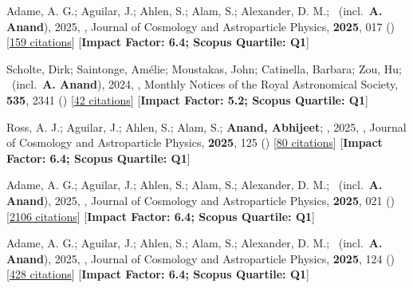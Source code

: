 \item[{\color{numcolor}\scriptsize9}] Adame, A. G.; Aguilar, J.; Ahlen, S.; Alam, S.; Alexander, D. M.; \etal\ (incl.\ \textbf{A. Anand}), 2025, , Journal of Cosmology and Astroparticle Physics, \textbf{2025}, 017 () [\href{https://ui.adsabs.harvard.edu/abs/2025JCAP...07..017A}{159 citations}] [\textbf{Impact Factor: 6.4; Scopus Quartile: Q1}]

\item[{\color{numcolor}\scriptsize8}] Scholte, Dirk; Saintonge, Am{\'e}lie; Moustakas, John; Catinella, Barbara; Zou, Hu; \etal\ (incl.\ \textbf{A. Anand}), 2024, , Monthly Notices of the Royal Astronomical Society, \textbf{535}, 2341 () [\href{https://ui.adsabs.harvard.edu/abs/2024MNRAS.535.2341S}{42 citations}] [\textbf{Impact Factor: 5.2; Scopus Quartile: Q1}]

\item[{\color{numcolor}\scriptsize7}] Ross, A. J.; Aguilar, J.; Ahlen, S.; Alam, S.; \textbf{Anand, Abhijeet}; \etal, 2025, , Journal of Cosmology and Astroparticle Physics, \textbf{2025}, 125 () [\href{https://ui.adsabs.harvard.edu/abs/2025JCAP...01..125R}{80 citations}] [\textbf{Impact Factor: 6.4; Scopus Quartile: Q1}]

\item[{\color{numcolor}\scriptsize6}] Adame, A. G.; Aguilar, J.; Ahlen, S.; Alam, S.; Alexander, D. M.; \etal\ (incl.\ \textbf{A. Anand}), 2025, , Journal of Cosmology and Astroparticle Physics, \textbf{2025}, 021 () [\href{https://ui.adsabs.harvard.edu/abs/2025JCAP...02..021A}{2106 citations}] [\textbf{Impact Factor: 6.4; Scopus Quartile: Q1}]

\item[{\color{numcolor}\scriptsize5}] Adame, A. G.; Aguilar, J.; Ahlen, S.; Alam, S.; Alexander, D. M.; \etal\ (incl.\ \textbf{A. Anand}), 2025, , Journal of Cosmology and Astroparticle Physics, \textbf{2025}, 124 () [\href{https://ui.adsabs.harvard.edu/abs/2025JCAP...01..124A}{428 citations}] [\textbf{Impact Factor: 6.4; Scopus Quartile: Q1}]

